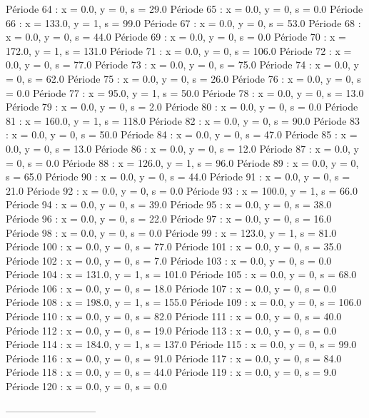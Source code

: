 Période 64 : x = 0.0, y = 0, s = 29.0
Période 65 : x = 0.0, y = 0, s = 0.0
Période 66 : x = 133.0, y = 1, s = 99.0
Période 67 : x = 0.0, y = 0, s = 53.0
Période 68 : x = 0.0, y = 0, s = 44.0
Période 69 : x = 0.0, y = 0, s = 0.0
Période 70 : x = 172.0, y = 1, s = 131.0
Période 71 : x = 0.0, y = 0, s = 106.0
Période 72 : x = 0.0, y = 0, s = 77.0
Période 73 : x = 0.0, y = 0, s = 75.0
Période 74 : x = 0.0, y = 0, s = 62.0
Période 75 : x = 0.0, y = 0, s = 26.0
Période 76 : x = 0.0, y = 0, s = 0.0
Période 77 : x = 95.0, y = 1, s = 50.0
Période 78 : x = 0.0, y = 0, s = 13.0
Période 79 : x = 0.0, y = 0, s = 2.0
Période 80 : x = 0.0, y = 0, s = 0.0
Période 81 : x = 160.0, y = 1, s = 118.0
Période 82 : x = 0.0, y = 0, s = 90.0
Période 83 : x = 0.0, y = 0, s = 50.0
Période 84 : x = 0.0, y = 0, s = 47.0
Période 85 : x = 0.0, y = 0, s = 13.0
Période 86 : x = 0.0, y = 0, s = 12.0
Période 87 : x = 0.0, y = 0, s = 0.0
Période 88 : x = 126.0, y = 1, s = 96.0
Période 89 : x = 0.0, y = 0, s = 65.0
Période 90 : x = 0.0, y = 0, s = 44.0
Période 91 : x = 0.0, y = 0, s = 21.0
Période 92 : x = 0.0, y = 0, s = 0.0
Période 93 : x = 100.0, y = 1, s = 66.0
Période 94 : x = 0.0, y = 0, s = 39.0
Période 95 : x = 0.0, y = 0, s = 38.0
Période 96 : x = 0.0, y = 0, s = 22.0
Période 97 : x = 0.0, y = 0, s = 16.0
Période 98 : x = 0.0, y = 0, s = 0.0
Période 99 : x = 123.0, y = 1, s = 81.0
Période 100 : x = 0.0, y = 0, s = 77.0
Période 101 : x = 0.0, y = 0, s = 35.0
Période 102 : x = 0.0, y = 0, s = 7.0
Période 103 : x = 0.0, y = 0, s = 0.0
Période 104 : x = 131.0, y = 1, s = 101.0
Période 105 : x = 0.0, y = 0, s = 68.0
Période 106 : x = 0.0, y = 0, s = 18.0
Période 107 : x = 0.0, y = 0, s = 0.0
Période 108 : x = 198.0, y = 1, s = 155.0
Période 109 : x = 0.0, y = 0, s = 106.0
Période 110 : x = 0.0, y = 0, s = 82.0
Période 111 : x = 0.0, y = 0, s = 40.0
Période 112 : x = 0.0, y = 0, s = 19.0
Période 113 : x = 0.0, y = 0, s = 0.0
Période 114 : x = 184.0, y = 1, s = 137.0
Période 115 : x = 0.0, y = 0, s = 99.0
Période 116 : x = 0.0, y = 0, s = 91.0
Période 117 : x = 0.0, y = 0, s = 84.0
Période 118 : x = 0.0, y = 0, s = 44.0
Période 119 : x = 0.0, y = 0, s = 9.0
Période 120 : x = 0.0, y = 0, s = 0.0

---------------------------

